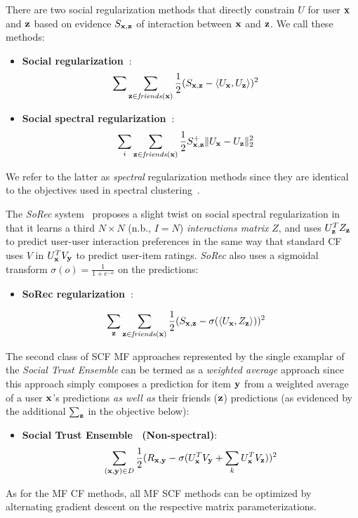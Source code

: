 There are two social regularization methods that directly constrain
$U$ for user $\mathbf{x}$ and $\mathbf{z}$ based on evidence $S_{\mathbf{x},\mathbf{z}}$ of interaction
between $\mathbf{x}$ and $\mathbf{z}$.  We call these methods:

\begin{itemize}
\item {\bf Social regularization~\cite{lla,socinf}}:
\begin{align}
\sum_{} & \sum_{\mathbf{z} \in \mathit{friends}(\mathbf{x})} \frac{1}{2} (S_{\mathbf{x},\mathbf{z}} - \langle U_{\mathbf{x}}, U_{\mathbf{z}} \rangle)^2 \nonumber 
\end{align}

\item {\bf Social spectral regularization~\cite{sr,rrmf}}:
\begin{align}
\sum_{i} & \sum_{\mathbf{z} \in \mathit{friends}(\mathbf{x})} \frac{1}{2} S^+_{\mathbf{x},\mathbf{z}} \| U_{\mathbf{x}} - U_{\mathbf{z}} \|_2^2 \nonumber
\end{align}
\end{itemize}
We refer to the latter as \emph{spectral} regularization methods since they are
identical to the objectives used in spectral clustering~\cite{spectral}.

The {\it SoRec} system~\cite{sorec} proposes a slight twist on social
spectral regularization in that it learns a third $N \times N$ (n.b., $I = N$)
\emph{interactions matrix} $Z$, and uses $U_{\mathbf{z}}^T Z_{\mathbf{z}}$ to predict user-user
interaction preferences in the same way that standard CF uses $V$ in
$U_{\mathbf{x}}^T V_{\mathbf{y}}$ to predict user-item ratings.  {\it SoRec} also uses a
sigmoidal transform $\sigma(o) = \frac{1}{1 + e^{-o}}$ on the predictions:

\begin{itemize}
\item {\bf SoRec regularization~\cite{sorec}}:

\begin{align}
\sum_{\mathbf{z}} & \sum_{\mathbf{z} \in \mathit{friends}(\mathbf{x})} \frac{1}{2} (S_{\mathbf{x},\mathbf{z}} - \sigma(\langle U_{\mathbf{x}}, Z_{\mathbf{z}} \rangle))^2 \nonumber
\end{align}
\end{itemize}

The second class of SCF MF approaches represented by the single
examplar of the {\it Social Trust Ensemble} can be termed as a
\emph{weighted average} approach since this approach simply composes a
prediction for item $\mathbf{y}$ from a weighted average of a user $\mathbf{x}$'s
predictions \emph{as well as} their friends ($\mathbf{z}$) predictions (as
evidenced by the additional $\sum_{\mathbf{z}}$ in the objective below):
\begin{itemize}
\item {\bf Social Trust Ensemble~\cite{ste} (Non-spectral)}:
\begin{align}
\sum_{(\mathbf{x},\mathbf{y}) \in D} \frac{1}{2} (R_{\mathbf{x},\mathbf{y}} - \sigma (U_{\mathbf{x}}^T V_{\mathbf{y}} + \sum_k U_{\mathbf{x}}^T V_{\mathbf{z}}))^2 \nonumber
\end{align}
\end{itemize}
As for the MF CF methods, all MF SCF methods can be optimized by alternating
gradient descent on the respective matrix parameterizations.

